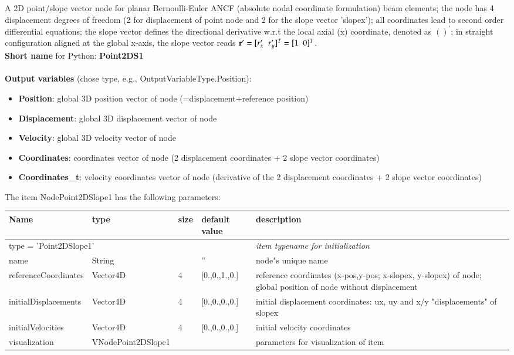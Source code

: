 A 2D point/slope vector node for planar Bernoulli-Euler ANCF (absolute nodal coordinate formulation) beam elements; the node has 4 displacement degrees of freedom (2 for displacement of point node and 2 for the slope vector 'slopex'); all coordinates lead to second order differential equations; the slope vector defines the directional derivative w.r.t the local axial (x) coordinate, denoted as $()^\prime$; in straight configuration aligned at the global x-axis, the slope vector reads $\mathbf{r}^\prime=[r_x^\prime\;\;r_y^\prime]^T=[1\;\;0]^T$.
 \\
{\bf Short name} for Python: {\bf Point2DS1}
 \\\\ 
{\bf Output variables} (chose type, e.g., OutputVariableType.Position): 
\begin{itemize}
    \item {\bf Position}: global 3D position vector of node (=displacement+reference position)
    \item {\bf Displacement}: global 3D displacement vector of node
    \item {\bf Velocity}: global 3D velocity vector of node
    \item {\bf Coordinates}: coordinates vector of node (2 displacement coordinates + 2 slope vector coordinates)
    \item {\bf Coordinates\_t}: velocity coordinates vector of node (derivative of the 2 displacement coordinates + 2 slope vector coordinates)
\end{itemize}
The item NodePoint2DSlope1 has the following parameters:
\begin{center}
  \footnotesize
  \begin{longtable}{| p{4.5cm} | p{2.5cm} | p{0.5cm} | p{2.5cm} | p{6cm} |}
    \hline
    \bf Name & \bf type & \bf size & \bf default value & \bf description \\ \hline
    \multicolumn{4}{l}{\parbox{10cm}{type = 'Point2DSlope1'}} & \multicolumn{1}{l}{\parbox{6cm}{\it item typename for initialization}}\\ \hline
    name &     String &      &     '' &     node"s unique name\\ \hline
    referenceCoordinates &     Vector4D &     4 &     [0.,0.,1.,0.] &     reference coordinates (x-pos,y-pos; x-slopex, y-slopex) of node; global position of node without displacement\\ \hline
    initialDisplacements &     Vector4D &     4 &     [0.,0.,0.,0.] &     initial displacement coordinates: ux, uy and x/y "displacements" of slopex\\ \hline
    initialVelocities &     Vector4D &     4 &     [0.,0.,0.,0.] &     initial velocity coordinates\\ \hline
    visualization & VNodePoint2DSlope1 & & & parameters for visualization of item \\ \hline
	  \end{longtable}
	\end{center}
